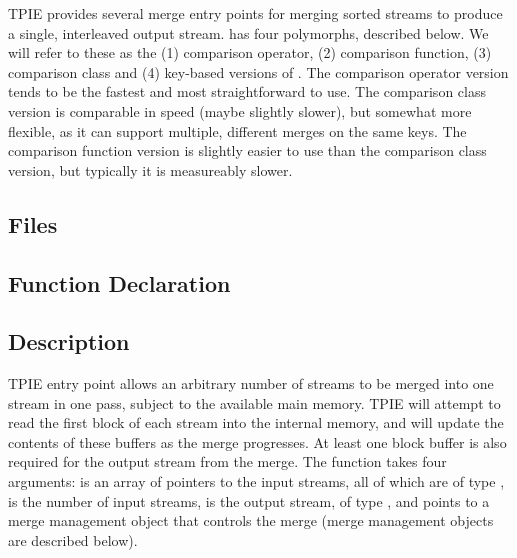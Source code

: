 TPIE provides several merge entry points for merging sorted streams to
produce a single, interleaved output stream.  has
four polymorphs, described below. We will refer to these as the (1)
comparison operator, (2) comparison function, (3) comparison class and (4) key-based
versions of . 
 The comparison operator version tends to
be the fastest and most straightforward to use. The
comparison class version is comparable in speed (maybe
slightly slower), but somewhat more flexible, as it can support
multiple, different merges on the same keys. The comparison
function version is slightly easier to use than the
comparison class version, but typically it is measureably slower.




\subsection{Files}
  \btabb
     {}
  \etabb

\subsection{Function Declaration}
  \btabb
     {}
  \etabb

\subsection{Description}
TPIE entry point  allows an
arbitrary number of streams to be merged into one stream in one pass,
subject to the available main memory.  TPIE will attempt to read the
first block of each stream into the internal memory, and will update
the contents of these buffers as the merge progresses. At least one
block buffer is also required for the output stream from the merge.
The function takes four arguments:
 is an array of pointers to the input streams, all of
  which are of type ,
 is the number of input streams,
 is the output stream, of type , and
 points to a merge management object that controls the
  merge (merge management objects are described below).

